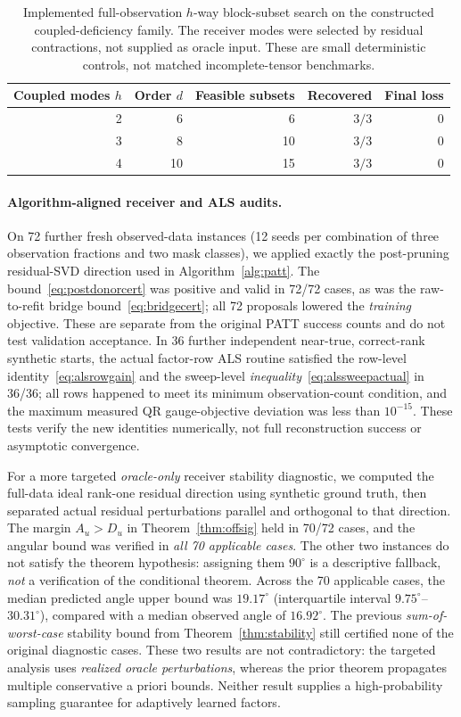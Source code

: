 \documentclass[review,10pt]{elsarticle}
\begin{document}
\begin{table}[tbp]
\caption{Implemented full-observation $h$-way block-subset search on the constructed coupled-deficiency family. The receiver modes were selected by residual contractions, not supplied as oracle input. These are small deterministic controls, not matched incomplete-tensor benchmarks.}\label{tab:blocktoy}
\centering\small
\begin{tabular}{rrrrr}
\toprule
Coupled modes $h$ & Order $d$ & Feasible subsets & Recovered & Final loss\\
\midrule
2 & 6 & 6 & $3/3$ & 0\\
3 & 8 & 10 & $3/3$ & 0\\
4 & 10 & 15 & $3/3$ & 0\\
\bottomrule
\end{tabular}
\end{table}

\paragraph{Algorithm-aligned receiver and ALS audits.}
On 72 further fresh observed-data instances (12 seeds per combination of three observation fractions and two mask classes), we applied exactly the post-pruning residual-SVD direction used in Algorithm~\ref{alg:patt}. The bound~\eqref{eq:postdonorcert} was positive and valid in 72/72 cases, as was the raw-to-refit bridge bound~\eqref{eq:bridgecert}; all 72 proposals lowered the \emph{training} objective. These are separate from the original PATT success counts and do not test validation acceptance. In 36 further independent near-true, correct-rank synthetic starts, the actual factor-row ALS routine satisfied the row-level identity~\eqref{eq:alsrowgain} and the sweep-level \emph{inequality}~\eqref{eq:alssweepactual} in 36/36; all rows happened to meet its minimum observation-count condition, and the maximum measured QR gauge-objective deviation was less than $10^{-15}$. These tests verify the new identities numerically, not full reconstruction success or asymptotic convergence.

For a more targeted \emph{oracle-only} receiver stability diagnostic, we computed the full-data ideal rank-one residual direction using synthetic ground truth, then separated actual residual perturbations parallel and orthogonal to that direction. The margin $A_u>D_u$ in Theorem~\ref{thm:offsig} held in 70/72 cases, and the angular bound was verified in \emph{all 70 applicable cases}. The other two instances do not satisfy the theorem hypothesis: assigning them $90^\circ$ is a descriptive fallback, \emph{not} a verification of the conditional theorem. Across the 70 applicable cases, the median predicted angle upper bound was $19.17^\circ$ (interquartile interval $9.75^\circ$--$30.31^\circ$), compared with a median observed angle of $16.92^\circ$. The previous \emph{sum-of-worst-case} stability bound from Theorem~\ref{thm:stability} still certified none of the original diagnostic cases. These two results are not contradictory: the targeted analysis uses \emph{realized oracle perturbations}, whereas the prior theorem propagates multiple conservative a priori bounds. Neither result supplies a high-probability sampling guarantee for adaptively learned factors.
\end{document}
